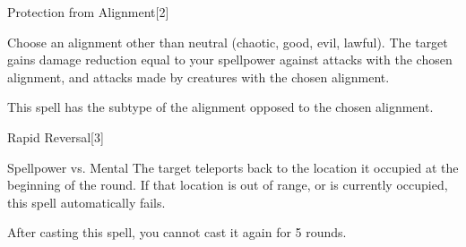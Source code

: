 \begin{spellsection}{Protection from Alignment}[2]
    \begin{spellheader}
    \end{spellheader}
    \begin{spellcontent}
        \begin{spelltargetinginfo}
        \end{spelltargetinginfo}
        \begin{spelleffects}
            \spellspecial Choose an alignment other than neutral (chaotic, good, evil, lawful).
            \spelleffect The target gains damage reduction equal to your spellpower against attacks with the chosen alignment, and attacks made by creatures with the chosen alignment.
            \spelldur \durshort \dismissable
        \end{spelleffects}
    \end{spellcontent}
    \begin{spellfooter}
        \spellnotes This spell has the subtype of the alignment opposed to the chosen alignment.
        \miscastrandom
    \end{spellfooter}
\end{spellsection}


\begin{spellsection}{Rapid Reversal}[3]
    \begin{spellheader}
    \end{spellheader}
    \begin{spellcontent}
        \begin{spelltargetinginfo}
        \end{spelltargetinginfo}
        \begin{spelleffects}
            \begin{spellattack}{Spellpower vs. Mental}
                \spellsuccess The target teleports back to the location it occupied at the beginning of the round.
                If that location is out of range, or is currently occupied, this spell automatically fails.
            \end{spellattack}
            \spellspecial After casting this spell, you cannot cast it again for 5 rounds.
        \end{spelleffects}
    \end{spellcontent}
    \begin{spellfooter}
        \miscastrandom
    \end{spellfooter}
\end{spellsection}

